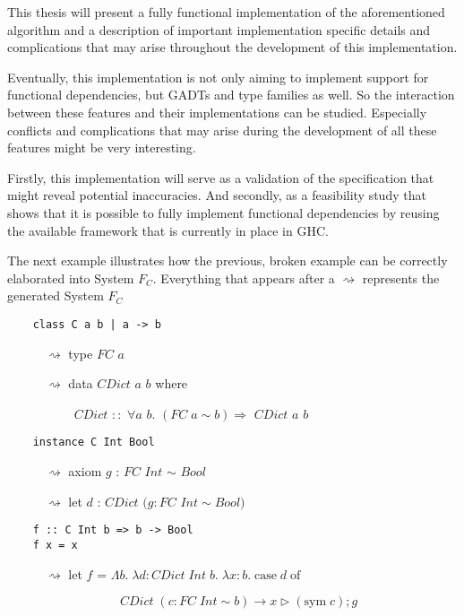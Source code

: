 This thesis will present a fully functional implementation of the aforementioned
algorithm and a description of important implementation specific details and
complications that may arise throughout the development of this implementation.

Eventually, this implementation is not only aiming to implement support for functional dependencies,
but GADTs and type families as well. So the interaction between these features
and their implementations can be studied. Especially conflicts and complications
that may arise during the development of all these features might be very
interesting.

Firstly, this implementation will serve as a validation of the specification
that might reveal potential inaccuracies. And secondly, as a feasibility study
that shows that it is possible to fully implement functional dependencies by
reusing the available framework that is currently in place in GHC.

The next example illustrates how the previous, broken example can be correctly
elaborated into System $F_C$. Everything that appears after a $\rightsquigarrow$
represents the generated System $F_C$
\begin{verbatim}
    class C a b | a -> b
\end{verbatim}

$\quad\quad\quad\rightsquigarrow$ type $FC$ $a$

$\quad\quad\quad\rightsquigarrow$ data $CDict$ $a$ $b$ where

$\quad\quad\quad\quad\quad$ $CDict$ $::$ $\forall a$ $b$. $(FC \; a \sim b)
\Rightarrow$ $CDict$ $a$ $b$

\begin{verbatim}
    instance C Int Bool
\end{verbatim}
$\quad\quad\quad\rightsquigarrow$ axiom $g$ : $FC$ $Int$ $\sim$ $Bool$

$\quad\quad\quad\rightsquigarrow$ let $d$ : $CDict$ $(g : FC$ $Int \sim Bool)$

\begin{verbatim}
    f :: C Int b => b -> Bool
    f x = x
\end{verbatim}
$\quad\quad\quad\rightsquigarrow$ let $f$ =
$\Lambda b. \; \lambda d : CDict \; Int \; b. \;\lambda x : b. \; \text{case} \; d
\; \text{of}$

$\quad\quad\quad\quad\quad\quad\quad\quad\quad %
CDict \; (c : FC \; Int \sim b ) \rightarrow x \triangleright (\text{sym} \; c) ; g$

